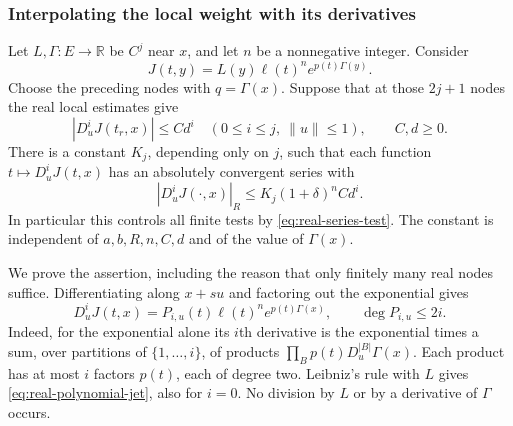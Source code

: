 \subsubsection{Interpolating the local weight with its derivatives}
Let $L,\Gamma:E\to\mathbb R$ be $C^j$ near $x$, and let $n$ be a
nonnegative integer. Consider
\begin{equation}\label{eq:real-local-weight}
             J(t,y)=L(y)\ell(t)^n e^{p(t)\Gamma(y)}.
\end{equation}
Choose the preceding nodes with $q=\Gamma(x)$. Suppose that at those
$2j+1$ nodes the real local estimates give
\begin{equation}\label{eq:real-node-jet}
               |D_u^iJ(t_r,x)|\le C d^i
 \quad(0\le i\le j,\ \|u\|\le1),
                      \qquad C,d\ge0.
\end{equation}
There is a constant $K_j$, depending only on $j$, such that each
function $t\mapsto D_u^iJ(t,x)$ has an absolutely convergent series
with
\begin{equation}\label{eq:real-local-series-price}
             |D_u^iJ(\cdot,x)|_R
                      \le K_j(1+\delta)^n C d^i.
\end{equation}
In particular this controls all finite tests by
\eqref{eq:real-series-test}. The constant is independent of
$a,b,R,n,C,d$ and of the value of $\Gamma(x)$.

We prove the assertion, including the reason that only finitely many
real nodes suffice. Differentiating along $x+su$ and factoring out
the exponential gives
\begin{equation}\label{eq:real-polynomial-jet}
 D_u^iJ(t,x)=P_{i,u}(t)\ell(t)^n e^{p(t)\Gamma(x)},
                           \qquad \deg P_{i,u}\le2i.
\end{equation}
Indeed, for the exponential alone its $i$th derivative is the
exponential times a sum, over partitions of $\{1,\ldots,i\}$,
of products $\prod_B p(t)D_u^{|B|}\Gamma(x)$. Each product has
at most $i$ factors $p(t)$, each of degree two. Leibniz's rule
with $L$ gives \eqref{eq:real-polynomial-jet}, also for $i=0$.
No division by $L$ or by a derivative of $\Gamma$ occurs.

